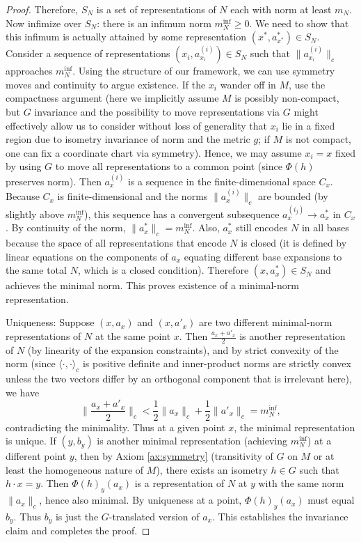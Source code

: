 \documentclass[11pt]{article}
\begin{document}
\begin{proof}
Therefore, $S_N$ is a set of representations of $N$ each with norm at least $m_N$. Now infimize over $S_N$: there is an infimum norm $m_N^{\inf} \ge 0$. We need to show that this infimum is actually attained by some representation $(x^*, a^*_{x^*}) \in S_N$. Consider a sequence of representations $(x_i, a^{(i)}_{x_i}) \in S_N$ such that $\|a^{(i)}_{x_i}\|_c$ approaches $m_N^{\inf}$. Using the structure of our framework, we can use symmetry moves and continuity to argue existence. If the $x_i$ wander off in $M$, use the compactness argument (here we implicitly assume $M$ is possibly non-compact, but $G$ invariance and the possibility to move representations via $G$ might effectively allow us to consider without loss of generality that $x_i$ lie in a fixed region due to isometry invariance of norm and the metric $g$; if $M$ is not compact, one can fix a coordinate chart via symmetry). Hence, we may assume $x_i = x$ fixed by using $G$ to move all representations to a common point (since $\Phi(h)$ preserves norm). Then $a^{(i)}_x$ is a sequence in the finite-dimensional space $C_x$. Because $C_x$ is finite-dimensional and the norms $\|a^{(i)}_x\|_c$ are bounded (by slightly above $m_N^{\inf}$), this sequence has a convergent subsequence $a^{(i_j)}_x \to a^*_x$ in $C_x$. By continuity of the norm, $\|a^*_x\|_c = m_N^{\inf}$. Also, $a^*_x$ still encodes $N$ in all bases because the space of all representations that encode $N$ is closed (it is defined by linear equations on the components of $a_x$ equating different base expansions to the same total $N$, which is a closed condition). Therefore $(x, a^*_x) \in S_N$ and achieves the minimal norm. This proves existence of a minimal-norm representation.

Uniqueness: Suppose $(x, a_x)$ and $(x, a'_x)$ are two different minimal-norm representations of $N$ at the same point $x$. Then $\frac{a_x + a'_x}{2}$ is another representation of $N$ (by linearity of the expansion constraints), and by strict convexity of the norm (since $\langle\cdot,\cdot\rangle_c$ is positive definite and inner-product norms are strictly convex unless the two vectors differ by an orthogonal component that is irrelevant here), we have 
\[\Big\|\frac{a_x + a'_x}{2}\Big\|_c < \frac{1}{2}\|a_x\|_c + \frac{1}{2}\|a'_x\|_c = m_N^{\inf},\] 
contradicting the minimality. Thus at a given point $x$, the minimal representation is unique. If $(y, b_y)$ is another minimal representation (achieving $m_N^{\inf}$) at a different point $y$, then by Axiom \ref{ax:symmetry} (transitivity of $G$ on $M$ or at least the homogeneous nature of $M$), there exists an isometry $h \in G$ such that $h\cdot x = y$. Then $\Phi(h)_y(a_x)$ is a representation of $N$ at $y$ with the same norm $\|a_x\|_c$, hence also minimal. By uniqueness at a point, $\Phi(h)_y(a_x)$ must equal $b_y$. Thus $b_y$ is just the $G$-translated version of $a_x$. This establishes the invariance claim and completes the proof.
\end{proof}
\end{document}

